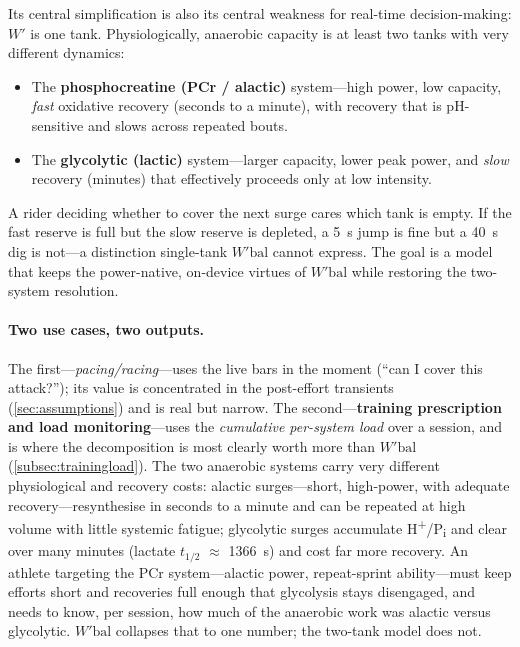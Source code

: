 \documentclass[11pt,a4paper]{article}
\newcommand{\Wp}{\ensuremath{W'}}
\newcommand{\Wbal}{\ensuremath{W'\!\text{bal}}}
\newcommand{\halft}{\ensuremath{t_{1/2}}}
\begin{document}
Its central simplification is also its central weakness for real-time decision-making: \Wp{} is one tank.
Physiologically, anaerobic capacity is at least two tanks with very different
dynamics:\citep{Margaria1933,diPrampero1999}

\begin{itemize}[leftmargin=1.4em,itemsep=1pt]
\item The \textbf{phosphocreatine (PCr / alactic)} system---high power, low capacity, \emph{fast}
oxidative recovery (seconds to a minute), with recovery that is pH-sensitive and slows across repeated
bouts.
\item The \textbf{glycolytic (lactic)} system---larger capacity, lower peak power, and \emph{slow}
recovery (minutes) that effectively proceeds only at low intensity.
\end{itemize}

A rider deciding whether to cover the next surge cares which tank is empty. If the fast reserve is full
but the slow reserve is depleted, a 5~s jump is fine but a 40~s dig
is not---a distinction single-tank \Wbal{} cannot express. The goal is a model that keeps the power-native,
on-device virtues of \Wbal{} while restoring the two-system resolution.

\paragraph{Two use cases, two outputs.} The first---\emph{pacing/racing}---uses the live bars in the
moment (``can I cover this attack?''); its value is concentrated in the post-effort transients
(\cref{sec:assumptions}) and is real but narrow. The second---\textbf{training prescription and load
monitoring}---uses the \emph{cumulative per-system load} over a session, and is where the decomposition is
most clearly worth more than \Wbal{} (\cref{subsec:trainingload}). The two anaerobic systems carry very
different physiological and recovery costs: alactic surges---short, high-power, with adequate
recovery---resynthesise in seconds to a minute and can be repeated at high volume with little systemic
fatigue; glycolytic surges accumulate H\textsuperscript{+}/P\textsubscript{i} and clear over many minutes
(lactate \halft{} $\approx$ 1366~s\citep{Ferguson2010}) and cost far more recovery.
An athlete targeting the PCr system---alactic power, repeat-sprint ability---must keep efforts short and
recoveries full enough that glycolysis stays disengaged, and needs to know, per session, how much of the
anaerobic work was alactic versus glycolytic. \Wbal{} collapses that to one number; the two-tank model
does not.
\end{document}
